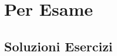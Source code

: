 \documentclass{article}
\begin{document}


\newpage
\section{Per Esame}


\subsection{Soluzioni Esercizi}
\end{document}
